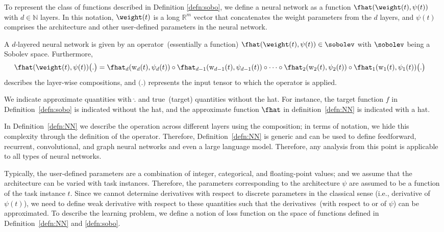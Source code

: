 To represent the class of functions described in Definition \ref{defn:sobo}, we  define a neural network as a function  $\fhat(\weight(t),  \psi(t) )$ with $d \in \mathbb{N}$ layers. In this notation, $\weight(t)$ is a long $\mathbb{R}^{m}$ vector that concatenates the weight parameters from the $d$ layers, and $\psi(t)$  comprises  the architecture and other user-defined parameters in the neural network.
\begin{definition} \label{defn:NN}
A $d$-layered neural network is given by an operator~(essentially a function) 
$\fhat(\weight(t), \psi(t) )\in \sobolev$ with $\sobolev$ being a Sobolev space. Furthermore, 
\begin{align}
  \fhat(\weight(t), \psi(t)) \big( . \big) & = \fhat_{d}(\mathrm{w}_{d}(t), \psi_{d}(t))\circ \fhat_{d-1}(\mathrm{w}_{d-1}(t), \psi_{d-1}(t))\circ \cdots \circ \fhat_{2}(\mathrm{w}_{2}(t), \psi_{2}(t))\circ \fhat_{1}(\mathrm{w}_{1}(t), \psi_{1}(t)) \big( . \big)
\end{align}
describes the layer-wise compositions, and $\big( . \big)$ represents the input tensor to which the operator is applied.
\end{definition}
\begin{remark}
    We indicate approximate quantities with $\hat{.}$ and true~(target) quantities without the hat. For instance, the target function $f$ in Definition~\ref{defn:sobo} is indicated without the hat, and the approximate function $\fhat$ in definition~\ref{defn:NN} is indicated with a hat.
\end{remark}
\begin{remark}
    In Definition~\ref{defn:NN} we describe the operation across different layers using the composition; in terms of notation, we hide this complexity through the definition of the operator. Therefore, Definition~\ref{defn:NN} is generic and  can be used to define feedforward, recurrent, convolutional, and graph  neural networks and even a large language model. Therefore, any analysis from this point is applicable to all types of neural networks. 
\end{remark}
Typically, the user-defined parameters are a combination of integer, categorical, and floating-point values; and we assume that the architecture can be varied with task instances. Therefore, the parameters corresponding to the architecture $\psi$ are assumed to be a function of the task instance $t.$
Since we cannot determine derivatives with respect to discrete parameters in the classical sense (i.e., derivative of $\psi(t)$), we need to define weak derivative with respect to these quantities such that the derivatives~(with respect to or of $\psi$) can be approximated. To describe the learning problem, we define a notion of loss function on the space of functions defined in Definition~\ref{defn:NN} and \ref{defn:sobo}. 
